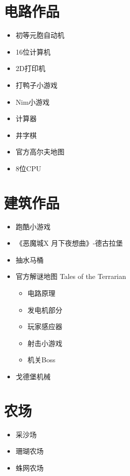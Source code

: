 \section{电路作品}
\begin{itemize}
\item {} 初等元胞自动机 
\item {} 16位计算机 
\item {} 2D打印机 
\item {} 打鸭子小游戏 
\item {} Nim小游戏 
\item {} 计算器 
\item {} 井字棋 
\item 官方高尔夫地图 
\item {} 8位CPU 
\end{itemize}

\section{建筑作品}
\begin{itemize}
\item {} 跑酷小游戏 
\item {} 《恶魔城X 月下夜想曲》-德古拉堡 
\item {} 抽水马桶 
\item 官方解谜地图 Tales of the Terrarian 
	\begin{itemize}
	\item 电路原理 
	\item 发电机部分 
	\item 玩家感应器 
	\item 射击小游戏 
	\item 机关Boss 
	\end{itemize}
\item {} 戈德堡机械 
\end{itemize}

\section{农场}
\begin{itemize}
\item {} 采沙场 
\item {} 珊瑚农场 
\item {} 蛛网农场 
\end{itemize}

